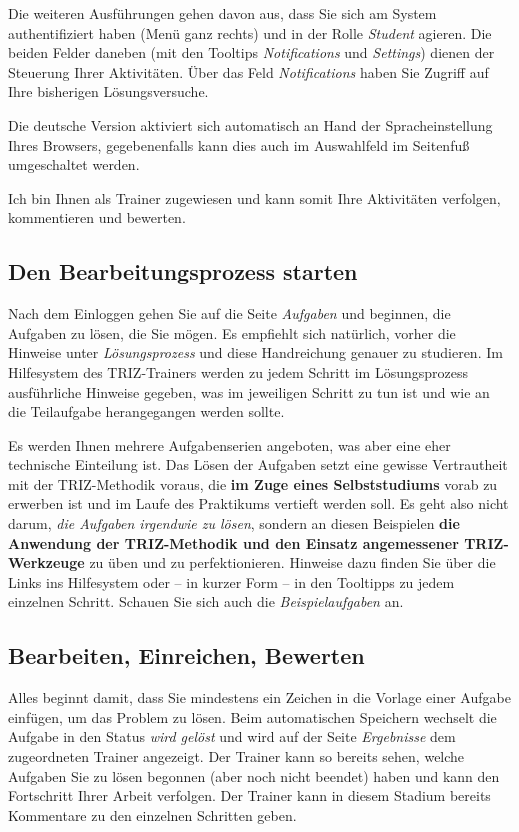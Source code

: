 \documentclass[11pt,a4paper]{article}
\begin{document}
Die weiteren Ausführungen gehen davon aus, dass Sie sich am System
authentifiziert haben (Menü ganz rechts) und in der Rolle \emph{Student}
agieren.  Die beiden Felder daneben (mit den Tooltips \emph{Notifications} und
\emph{Settings}) dienen der Steuerung Ihrer Aktivitäten. Über das Feld
\emph{Notifications} haben Sie Zugriff auf Ihre bisherigen Lösungsversuche.

Die deutsche Version aktiviert sich automatisch an Hand der Spracheinstellung
Ihres Browsers, gegebenenfalls kann dies auch im Auswahlfeld im Seitenfuß
umgeschaltet werden.

Ich bin Ihnen als Trainer zugewiesen und kann somit Ihre Aktivitäten
verfolgen, kommentieren und bewerten.

\subsection{Den Bearbeitungsprozess starten}

Nach dem Einloggen gehen Sie auf die Seite \emph{Aufgaben} und beginnen, die
Aufgaben zu lösen, die Sie mögen.  Es empfiehlt sich natürlich, vorher die
Hinweise unter \emph{Lösungsprozess} und diese Handreichung genauer zu
studieren.  Im Hilfesystem des TRIZ-Trainers werden zu jedem Schritt im
Lösungsprozess ausführliche Hinweise gegeben, was im jeweiligen Schritt zu tun
ist und wie an die Teilaufgabe herangegangen werden sollte.

Es werden Ihnen mehrere Aufgabenserien angeboten, was aber eine eher
technische Einteilung ist.  Das Lösen der Aufgaben setzt eine gewisse
Vertrautheit mit der TRIZ-Methodik voraus, die \textbf{im Zuge eines
  Selbststudiums} vorab zu erwerben ist und im Laufe des Praktikums vertieft
werden soll.  Es geht also nicht darum, \emph{die Aufgaben irgendwie zu
  lösen}, sondern an diesen Beispielen \textbf{die Anwendung der TRIZ-Methodik
  und den Einsatz angemessener TRIZ-Werkzeuge} zu üben und zu perfektionieren.
Hinweise dazu finden Sie über die Links ins Hilfesystem oder -- in kurzer Form
-- in den Tooltipps zu jedem einzelnen Schritt. Schauen Sie sich auch die
\emph{Beispielaufgaben} an.

\subsection{Bearbeiten, Einreichen, Bewerten} 

Alles beginnt damit, dass Sie mindestens ein Zeichen in die Vorlage einer
Aufgabe einfügen, um das Problem zu lösen. Beim automatischen Speichern
wechselt die Aufgabe in den Status \emph{wird gelöst} und wird auf der Seite
\emph{Ergebnisse} dem zugeordneten Trainer angezeigt. Der Trainer kann so
bereits sehen, welche Aufgaben Sie zu lösen begonnen (aber noch nicht beendet)
haben und kann den Fortschritt Ihrer Arbeit verfolgen. Der Trainer kann in
diesem Stadium bereits Kommentare zu den einzelnen Schritten geben.
\end{document}
